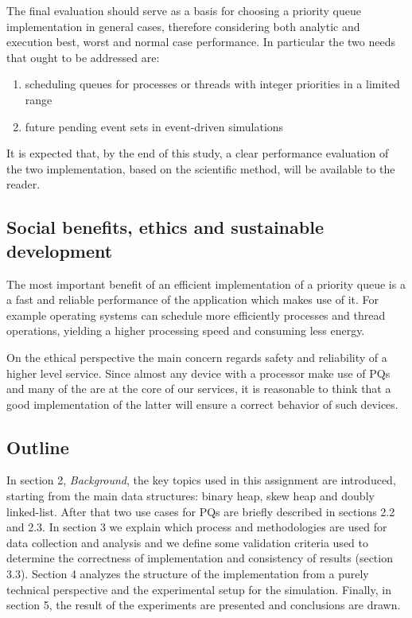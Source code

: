\documentclass{article}
\begin{document}
The final evaluation should serve as a basis for choosing a priority queue implementation in general cases, therefore considering both analytic and execution best, worst and normal case performance. In particular the two needs that ought to be addressed are:

\begin{enumerate}
    \item scheduling queues for processes or threads with integer priorities in a limited range
    \item future pending event sets in event-driven simulations
\end{enumerate}

It is expected that, by the end of this study, a clear performance evaluation of the two implementation, based on the scientific method, will be available to the reader. 

\pagebreak



\subsection{Social benefits, ethics and sustainable development}
The most important benefit of an efficient implementation of a priority queue is a a fast and reliable performance of the application which makes use of it. For example operating systems can schedule more efficiently processes and thread operations, yielding a higher processing speed and consuming less energy.

On the ethical perspective the main concern regards safety and reliability of a higher level service. Since almost any device with a processor make use of PQs and many of the are at the core of our services, it is reasonable to think that a good implementation of the latter will ensure a correct behavior of such devices.

\pagebreak



\subsection{Outline}
In section 2, \textit{Background}, the key topics used in this assignment are introduced, starting from the main data structures: binary heap, skew heap and doubly linked-list. After that two use cases for PQs are briefly described in  sections 2.2 and 2.3. In section 3 we explain which process and methodologies are used for data collection and analysis and we define some validation criteria used to determine the correctness of implementation and consistency of results (section 3.3). Section 4 analyzes the structure of the implementation from a purely technical perspective and the experimental setup for the simulation. Finally, in section 5, the result of the experiments are presented and conclusions are drawn.
\end{document}
